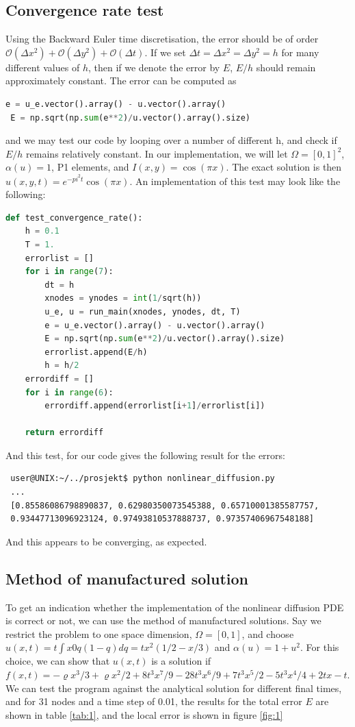 \documentclass[12pt]{article}
\begin{document}
\subsection{Convergence rate test}
Using the Backward Euler time discretisation, the error should be of order $\mathcal{O}(\Delta x^2) + \mathcal{O}(\Delta y^2) + \mathcal{O}(\Delta t)$. If we set $\Delta t = \Delta x^2 = \Delta y^2 = h$ for many different values of $h$, then if we denote the error by $E$, $E/h$ should remain approximately constant. The error can be computed as
\begin{lstlisting}[language=Python]
 e = u_e.vector().array() - u.vector().array()
 E = np.sqrt(np.sum(e**2)/u.vector().array().size)
\end{lstlisting}
and we may test our code by looping over a number of different h, and check if $E/h$ remains relatively constant. In our implementation, we will let $\Omega = [0,1]^2$, $\alpha(u) = 1$, P1 elements, and $I(x,y) = \cos(\pi x)$. The exact solution is then $u(x,y,t) = e^{-pi^2t}\cos(\pi x)$. An implementation of this test may look like the following:
\begin{lstlisting}[language=Python]
 def test_convergence_rate():
	h = 0.1
	T = 1.
	errorlist = []
	for i in range(7):
		dt = h
		xnodes = ynodes = int(1/sqrt(h))
		u_e, u = run_main(xnodes, ynodes, dt, T)
		e = u_e.vector().array() - u.vector().array()
 		E = np.sqrt(np.sum(e**2)/u.vector().array().size)
 		errorlist.append(E/h)
 		h = h/2
 	errordiff = []
 	for i in range(6):
 		errordiff.append(errorlist[i+1]/errorlist[i])
 		
 	return errordiff
\end{lstlisting}
And this test, for our code gives the following result for the errors: 
\begin{verbatim}
 user@UNIX:~/../prosjekt$ python nonlinear_diffusion.py
 ...
 [0.85586086798890837, 0.62980350073545388, 0.65710001385587757, 
 0.93447713096923124, 0.97493810537888737, 0.97357406967548188]
\end{verbatim}
And this appears to be converging, as expected.

\subsection{Method of manufactured solution}
To get an indication whether the implementation of the nonlinear diffusion PDE is correct or not, we can use the method of manufactured solutions. Say we restrict the problem to one space dimension, $\Omega=[0,1]$, and choose $u(x,t)=t∫x0q(1−q)dq=tx^2(1/2−x/3)$
and $\alpha(u)=1+u^2$. For this choice, we can show that $u(x,t)$ is a solution if $f(x,t)= -\varrho x^3/3 + \varrho x^2/2 + 8t^3x^7/9 - 28t^3x^6/9 + 7t^3x^5/2 - 5t^3x^4/4 + 2tx - t$. We can test the program against the analytical solution for different final times, and for 31 nodes and a time step of 0.01, the results for the total error $E$ are shown in table \ref{tab:1}, and the local error is shown in figure \ref{fig:1}
\end{document}
